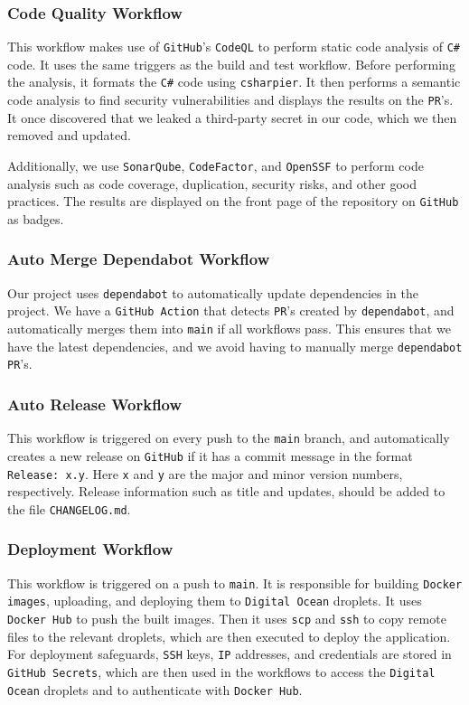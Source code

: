 \subsubsection{Code Quality Workflow}
This workflow makes use of \texttt{GitHub}'s \texttt{CodeQL}\cite{codeql} 
to perform static code analysis of \texttt{C\#} code.
It uses the same triggers as the build and test workflow.
Before performing the analysis, it formats the \texttt{C\#} code using 
\texttt{csharpier}\cite{csharpier}.
It then performs a semantic code analysis to find security 
vulnerabilities and displays the results on the \texttt{PR}'s.
It once discovered that we leaked a third-party secret 
in our code, which we then removed and updated.

Additionally, we use \texttt{SonarQube}\cite{sonarqube}, 
\texttt{CodeFactor}\cite{codefactor}, and \texttt{OpenSSF}\cite{Openssf} 
to perform code analysis such as code coverage, duplication, 
security risks, and other good practices.
The results are displayed on the front page of the repository 
on \texttt{GitHub} as badges.

\subsubsection{Auto Merge Dependabot Workflow}
Our project uses \texttt{dependabot} to automatically update
dependencies in the project.
We have a \texttt{GitHub Action} that detects \texttt{PR}'s 
created by \texttt{dependabot}, and automatically merges 
them into \texttt{main} if all workflows pass.
This ensures that we have the latest dependencies,
and we avoid having to manually merge \texttt{dependabot} 
\texttt{PR}'s.

\subsubsection{Auto Release Workflow}
This workflow is triggered on every push to the 
\texttt{main} branch, and automatically 
creates a new release on \texttt{GitHub} if it has
a commit message in the format \texttt{Release: x.y}. 
Here \texttt{x} and \texttt{y} are the major and minor version numbers, respectively.
Release information such as title and updates, should be added to the file \texttt{CHANGELOG.md}.

\subsubsection{Deployment Workflow}
This workflow is triggered on a push to \texttt{main}.
It is responsible for building \texttt{Docker images}, 
uploading, and deploying them to \texttt{Digital Ocean} droplets.
It uses \texttt{Docker Hub} to push the built images.
Then it uses \texttt{scp} and \texttt{ssh} to copy remote files 
to the relevant droplets, which are then executed to 
deploy the application. For deployment safeguards,
\texttt{SSH} keys, \texttt{IP} addresses, and credentials are stored in \texttt{GitHub Secrets},
which are then used in the workflows to access the \texttt{Digital Ocean} droplets and to 
authenticate with \texttt{Docker Hub}.


